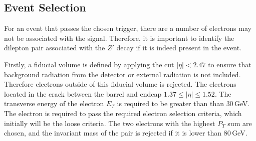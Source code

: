\documentclass{article}
\begin{document}

\subsection{Event Selection}

For an event that passes the chosen trigger, there are a number of electrons may not be associated with the signal. Therefore, it is important to identify the dilepton pair associated with the $Z'$ decay if it is indeed present in the event. 

Firstly, a fiducial volume is defined by applying the cut $|\eta|<2.47$ to ensure that background radiation from the detector or external radiation is not included. Therefore electrons outside of this fiducial volume is rejected. 
The electrons located in the crack between the barrel and endcap $1.37\leq|\eta|\leq1.52$.
The transverse energy of the electron $E_T$ is required to be greater than than $30\,$GeV. 
The electron is required to pass the required electron selection criteria, which initially will be the loose criteria.
The two electrons with the highest $P_T$ sum are chosen, and the invariant mass of the pair is rejected if it is lower than $80\,$GeV.
\end{document}
